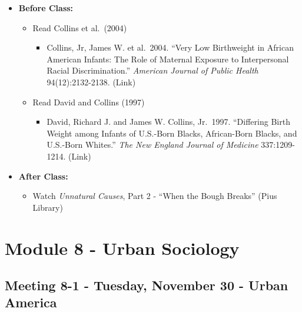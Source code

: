 \documentclass[
]{book}
\providecommand{\tightlist}{%
  \setlength{\itemsep}{0pt}\setlength{\parskip}{0pt}}
\begin{document}
\begin{itemize}
\tightlist
\item
  \textbf{Before Class:}

  \begin{itemize}
  \tightlist
  \item
    Read Collins et al.~(2004)

    \begin{itemize}
    \tightlist
    \item
      Collins, Jr, James W. et al.~2004. ``Very Low Birthweight in African American Infants: The Role of Maternal Exposure to Interpersonal Racial Discrimination.'' \emph{American Journal of Public Health} 94(12):2132-2138. (Link)
    \end{itemize}
  \item
    Read David and Collins (1997)

    \begin{itemize}
    \tightlist
    \item
      David, Richard J. and James W. Collins, Jr.~1997. ``Differing Birth Weight among Infants of U.S.-Born Blacks, African-Born Blacks, and U.S.-Born Whites.'' \emph{The New England Journal of Medicine} 337:1209-1214. (Link)
    \end{itemize}
  \end{itemize}
\item
  \textbf{After Class:}

  \begin{itemize}
  \tightlist
  \item
    Watch \emph{Unnatural Causes}, Part 2 - ``When the Bough Breaks'' (Pius Library)
  \end{itemize}
\end{itemize}

\newpage

\hypertarget{module-8---urban-sociology}{%
\section{Module 8 - Urban Sociology}\label{module-8---urban-sociology}}

\hypertarget{meeting-8-1---tuesday-november-30---urban-america}{%
\subsection*{Meeting 8-1 - Tuesday, November 30 - Urban America}\label{meeting-8-1---tuesday-november-30---urban-america}}
\end{document}
